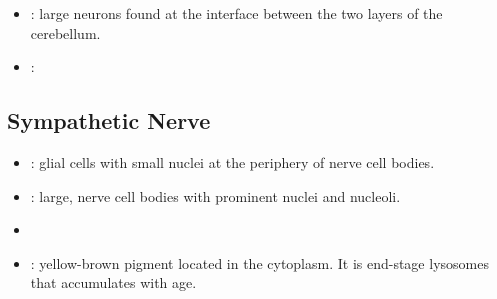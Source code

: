 \begin{itemize}
\begin{multicols}{2}
\begin{itemize}
    \item {}: large neurons found at the interface between the two layers of the cerebellum.
    
    \begin{center}
    \end{center}

    \item {}: 
    
    \begin{center}
    \end{center}

  \end{itemize}
  \end{multicols}

  \subsection{Sympathetic Nerve}
  \begin{multicols}{2}
  \begin{itemize}
    \item {}: glial cells with small nuclei at the periphery of nerve cell bodies.

     \begin{center}
    \end{center}
    
    \item {}: large, nerve cell bodies with prominent nuclei and nucleoli.

     \begin{center}
    \end{center}

    \item {}

    \begin{center}
    \end{center}

    \item {}: yellow-brown pigment located in the cytoplasm. It is end-stage lysosomes that accumulates with age.
    
    \begin{center}
    \end{center}
  

\end{itemize}
\end{multicols}
\end{itemize}
